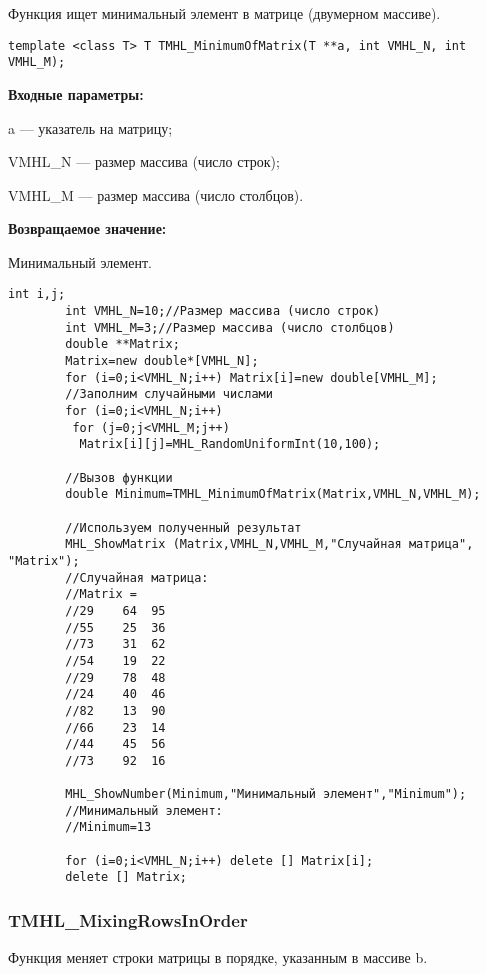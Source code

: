 \documentclass[a4paper,12pt]{article}
\begin{document}
Функция ищет минимальный элемент в матрице (двумерном массиве).


\begin{lstlisting}[label=code_syntax_TMHL_MinimumOfMatrix,caption=Синтаксис]
template <class T> T TMHL_MinimumOfMatrix(T **a, int VMHL_N, int VMHL_M);
\end{lstlisting}

\textbf{Входные параметры:}

 a --- указатель на матрицу;
 
 VMHL\_N --- размер массива (число строк);
 
 VMHL\_M --- размер массива (число столбцов).

\textbf{Возвращаемое значение:}

 Минимальный элемент.


\begin{lstlisting}[label=code_use_TMHL_MinimumOfMatrix,caption=Пример использования]
        int i,j;
        int VMHL_N=10;//Размер массива (число строк)
        int VMHL_M=3;//Размер массива (число столбцов)
        double **Matrix;
        Matrix=new double*[VMHL_N];
        for (i=0;i<VMHL_N;i++) Matrix[i]=new double[VMHL_M];
        //Заполним случайными числами
        for (i=0;i<VMHL_N;i++)
         for (j=0;j<VMHL_M;j++)
          Matrix[i][j]=MHL_RandomUniformInt(10,100);

        //Вызов функции
        double Minimum=TMHL_MinimumOfMatrix(Matrix,VMHL_N,VMHL_M);

        //Используем полученный результат
        MHL_ShowMatrix (Matrix,VMHL_N,VMHL_M,"Случайная матрица", "Matrix");
        //Случайная матрица:
        //Matrix =
        //29	64	95
        //55	25	36
        //73	31	62
        //54	19	22
        //29	78	48
        //24	40	46
        //82	13	90
        //66	23	14
        //44	45	56
        //73	92	16

        MHL_ShowNumber(Minimum,"Минимальный элемент","Minimum");
        //Минимальный элемент:
        //Minimum=13

        for (i=0;i<VMHL_N;i++) delete [] Matrix[i];
        delete [] Matrix;
\end{lstlisting}

\subsubsection{TMHL\_MixingRowsInOrder}\label{TMHL_MixingRowsInOrder}

Функция меняет строки матрицы в порядке, указанным в массиве b.
\end{document}
